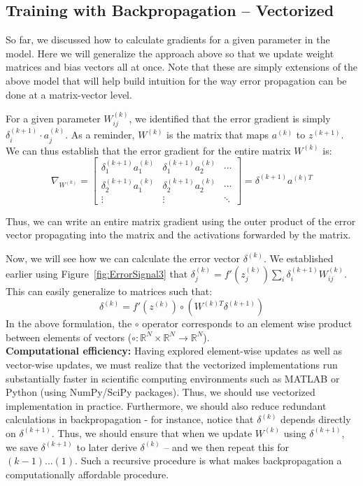 \documentclass{tufte-handout}
\begin{document}
\subsection{Training with Backpropagation -- Vectorized}\label{sec:backprop2}

So far, we discussed how to calculate gradients for a given parameter in the model. Here we will generalize the approach above so that we update weight matrices and bias vectors all at once. Note that these are simply extensions of the above model that will help build intuition for the way error propagation can be done at a matrix-vector level.

For a given parameter $W_{ij}^{(k)}$, we identified that the error gradient is simply $\delta_{i}^{(k+1)}\cdot a_j^{(k)}$. As a reminder, $W^{(k)}$ is the matrix that maps $a^{(k)}$ to $z^{(k+1)}$. We can thus establish that the error gradient for the entire matrix $W^{(k)}$ is: 
$$ \nabla_{W^{(k)}} = \begin{bmatrix} \delta_{1}^{(k+1)} a_1^{(k)} & \delta_{1}^{(k+1)} a_2^{(k)} & \cdots \\ \delta_{2}^{(k+1)} a_1^{(k)} & \delta_{2}^{(k+1)} a_2^{(k)} & \cdots \\ \vdots & \vdots & \ddots \end{bmatrix} = \delta^{(k+1)} a^{(k)T}$$


Thus, we can write an entire matrix gradient using the outer product of the error vector propagating into the matrix and the activations forwarded by the matrix.

Now, we will see how we can calculate the error vector $\delta^{(k)}$. We established earlier using Figure~\ref{fig:ErrorSignal3} that $\delta^{(k)}_j =f'(z_j^{(k)}) \sum_i \delta^{(k+1)}_i W^{(k)}_{ij}$. This can easily generalize to matrices such that:
$$\delta^{(k)} = f'(z^{(k)}) \circ (W^{(k)T} \delta^{(k+1)}) $$
In the above formulation, the $\circ$ operator corresponds to an element wise product between elements of vectors ($\circ : \mathbb{R}^N \times \mathbb{R}^N \rightarrow \mathbb{R}^N$).
$$ $$
\textbf{Computational efficiency:} Having explored element-wise updates as well as vector-wise updates, we must realize that the vectorized implementations run substantially faster in scientific computing environments such as MATLAB or Python (using NumPy/SciPy packages). Thus, we should use vectorized implementation in practice. Furthermore, we should also reduce redundant calculations in backpropagation - for instance, notice that $\delta^{(k)}$ depends directly on $\delta^{(k+1)}$. Thus, we should ensure that when we update $W^{(k)}$ using $\delta^{(k+1)}$, we save $\delta^{(k+1)}$ to later derive $\delta^{(k)}$ -- and we then repeat this for $(k-1)\hdots(1)$. Such a recursive procedure is what makes backpropagation a computationally affordable procedure.
\end{document}
